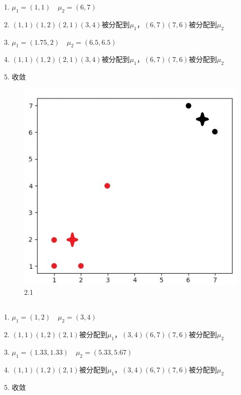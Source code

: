 \documentclass[12pt, a4paper]{article}
\begin{document}
1. $\mu_1=(1,1)\quad\mu_2=(6,7)$

2. $(1,1)(1,2)(2,1)(3,4)$被分配到$\mu_1$，$(6,7)(7,6)$被分配到$\mu_2$

3. $\mu_1=(1.75,2)\quad\mu_2=(6.5,6.5)$

4. $(1,1)(1,2)(2,1)(3,4)$被分配到$\mu_1$，$(6,7)(7,6)$被分配到$\mu_2$

5. 收敛
    
\begin{figure}
    \centering
    \includegraphics*[scale=0.8]{img/a5_2.jpg}
    \caption{2.1}
\end{figure}

\subsection{}

1. $\mu_1=(1,2)\quad\mu_2=(3,4)$

2. $(1,1)(1,2)(2,1)$被分配到$\mu_1$，$(3,4)(6,7)(7,6)$被分配到$\mu_2$

3. $\mu_1=(1.33,1.33)\quad\mu_2=(5.33,5.67)$

4. $(1,1)(1,2)(2,1)$被分配到$\mu_1$，$(3,4)(6,7)(7,6)$被分配到$\mu_2$

5. 收敛
\end{document}
